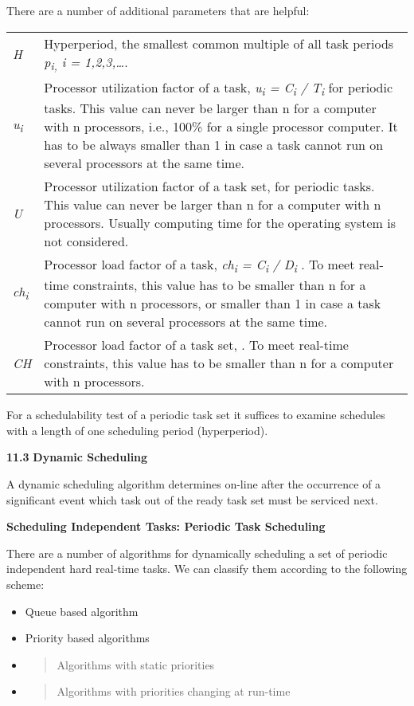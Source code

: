 There are a number of additional parameters that are helpful:

\begin{longtable}[c]{@{}ll@{}}
\toprule
\emph{H} & Hyperperiod, the smallest common multiple of all task periods
\emph{p\textsubscript{i,} i = 1,2,3,\ldots{}}.\tabularnewline
\emph{u\textsubscript{i}} & Processor utilization factor of a task,
\emph{u\textsubscript{i} = C\textsubscript{i} / T\textsubscript{i}} for
periodic tasks. This value can never be larger than n for a computer
with n processors, i.e., 100\% for a single processor computer. It has
to be always smaller than 1 in case a task cannot run on several
processors at the same time.\tabularnewline
\emph{U} & Processor utilization factor of a task set, for periodic
tasks. This value can never be larger than n for a computer with n
processors. Usually computing time for the operating system is not
considered.\tabularnewline
\emph{ch\textsubscript{i}} & Processor load factor of a task,
\emph{ch\textsubscript{i} = C\textsubscript{i} / D\textsubscript{i}} .
To meet real-time constraints, this value has to be smaller than n for a
computer with n processors, or smaller than 1 in case a task cannot run
on several processors at the same time.\tabularnewline
\emph{CH} & Processor load factor of a task set, . To meet real-time
constraints, this value has to be smaller than n for a computer with n
processors.\tabularnewline
\bottomrule
\end{longtable}

For a schedulability test of a periodic task set it suffices to examine
schedules with a length of one scheduling period (hyperperiod).

\textbf{11.3} \protect\hypertarget{teil4}{}{}\textbf{Dynamic Scheduling
}

A dynamic scheduling algorithm determines on-line after the occurrence
of a significant event which task out of the ready task set must be
serviced next.

\textbf{Scheduling Independent Tasks: Periodic Task Scheduling}

There are a number of algorithms for dynamically scheduling a set of
periodic independent hard real-time tasks. We can classify them
according to the following scheme:

\begin{itemize}
\item
  Queue based algorithm
\item
  Priority based algorithms
\item
  \begin{quote}
  Algorithms with static priorities
  \end{quote}
\item
  \begin{quote}
  Algorithms with priorities changing at run-time
  \end{quote}
\end{itemize}

